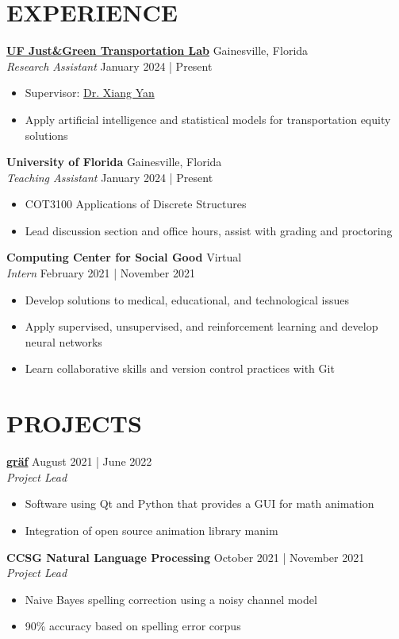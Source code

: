 \documentclass[a4paper,9pt]{extarticle}
\begin{document}
\section*{EXPERIENCE}
\noindent
\textbf{\href{https://jacobyan0.github.io/}{UF Just\&Green Transportation Lab}} \hfill Gainesville, Florida\\ %
\textit{Research Assistant} \hfill January 2024 | Present%
\begin{itemize}
    \item Supervisor: \href{https://www.essie.ufl.edu/people/name/xiang-yan/}{Dr. Xiang Yan}
    \item Apply artificial intelligence and statistical models for transportation equity solutions
\end{itemize}
\textbf{University of Florida} \hfill Gainesville, Florida\\ %
\textit{Teaching Assistant} \hfill January 2024 | Present%
\begin{itemize}
    \item COT3100 Applications of Discrete Structures
    \item Lead discussion section and office hours, assist with grading and proctoring
\end{itemize}
\textbf{Computing Center for Social Good} \hfill Virtual\\ %
\textit{Intern} \hfill February 2021 | November 2021 %
\begin{itemize}
    \item Develop solutions to medical, educational, and technological issues
    \item Apply supervised, unsupervised, and reinforcement learning and develop neural networks
    \item Learn collaborative skills and version control practices with Git
\end{itemize}

\section*{PROJECTS}
\noindent
\textbf{\href{https://github.com/heyuncle/graf}{gräf}} \hfill August 2021 | June 2022 \\
\textit{Project Lead}
\begin{itemize}
     \item Software using Qt and Python that provides a GUI for math animation
     \item Integration of open source animation library manim
\end{itemize}
\textbf{CCSG Natural Language Processing} \hfill October 2021 | November 2021 \\
\textit{Project Lead}
\begin{itemize}
     \item Naive Bayes spelling correction using a noisy channel model
     \item 90\% accuracy based on spelling error corpus
\end{itemize}
\end{document}
